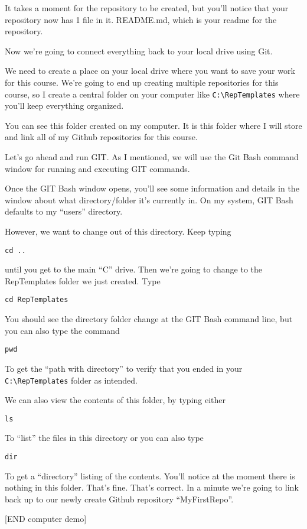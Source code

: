 \documentclass[
]{book}
\begin{document}
It takes a moment for the repository to be created, but you'll notice that your repository now has 1 file in it. README.md, which is your readme for the repository.

Now we're going to connect everything back to your local drive using Git.

We need to create a place on your local drive where you want to save your work for this course. We're going to end up creating multiple repositories for this course, so I create a central folder on your computer like \texttt{C:\textbackslash{}RepTemplates} where you'll keep everything organized.

You can see this folder created on my computer. It is this folder where I will store and link all of my Github repositories for this course.

Let's go ahead and run GIT. As I mentioned, we will use the Git Bash command window for running and executing GIT commands.

Once the GIT Bash window opens, you'll see some information and details in the window about what directory/folder it's currently in. On my system, GIT Bash defaults to my ``users'' directory.

However, we want to change out of this directory. Keep typing

\texttt{cd\ ..}

until you get to the main ``C'' drive. Then we're going to change to the RepTemplates folder we just created. Type

\texttt{cd\ RepTemplates}

You should see the directory folder change at the GIT Bash command line, but you can also type the command

\texttt{pwd}

To get the ``path with directory'' to verify that you ended in your \texttt{C:\textbackslash{}RepTemplates} folder as intended.

We can also view the contents of this folder, by typing either

\texttt{ls}

To ``list'' the files in this directory or you can also type

\texttt{dir}

To get a ``directory'' listing of the contents. You'll notice at the moment there is nothing in this folder. That's fine. That's correct. In a minute we're going to link back up to our newly create Github repository ``MyFirstRepo''.

{[}END computer demo{]}
\end{document}
